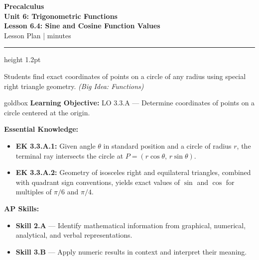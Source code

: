 \documentclass[10pt]{article}
\newcommand{\CourseName}{Precalculus}
\newcommand{\MeetingLength}{60 minutes}
\newcommand{\UnitNumberName}{Unit 6: Trigonometric Functions \quad}
\newcommand{\LessonNumberName}{Lesson 6.4: Sine and Cosine Function Values}
\begin{document}
\begin{center}
  {\Large\bfseries\color{navy} \CourseName}\\[4pt]
  {\large\bfseries \UnitNumberName}\\[2pt]
  {\large\bfseries \LessonNumberName}\\[2pt]
  {\normalsize Lesson Plan \quad|\quad \MeetingLength}
\end{center}
\vspace{6pt}
\hrule height 1.2pt
\vspace{10pt}

\begin{tcolorbox}[colback=sky!30, colframe=navy, title=\textbf{Primary Objective},
  fonttitle=\bfseries\color{white}, arc=2mm, left=4mm, right=4mm, top=2mm, bottom=2mm]
Students find exact coordinates of points on a circle of any radius using special right triangle geometry.
\quad \textit{(Big Idea: Functions)}
\end{tcolorbox}
\vspace{8pt}

\begin{skillbox}{goldbox}
\textbf{Learning Objective:} LO 3.3.A --- Determine coordinates of points on a circle centered at the origin.

\medskip
\textbf{Essential Knowledge:}
\begin{itemize}
  \item \textbf{EK 3.3.A.1:} Given angle $\theta$ in standard position and a circle of radius $r$, the terminal ray intersects the circle at $P = (r\cos\theta,\, r\sin\theta)$.
  \item \textbf{EK 3.3.A.2:} Geometry of isosceles right and equilateral triangles, combined with quadrant sign conventions, yields exact values of $\sin$ and $\cos$ for multiples of $\pi/6$ and $\pi/4$.
\end{itemize}

\medskip
\textbf{AP Skills:}
\begin{itemize}
  \item \textbf{Skill 2.A} --- Identify mathematical information from graphical, numerical, analytical, and verbal representations.
  \item \textbf{Skill 3.B} --- Apply numeric results in context and interpret their meaning.
\end{itemize}
\end{skillbox}
\vspace{6pt}
\end{document}

